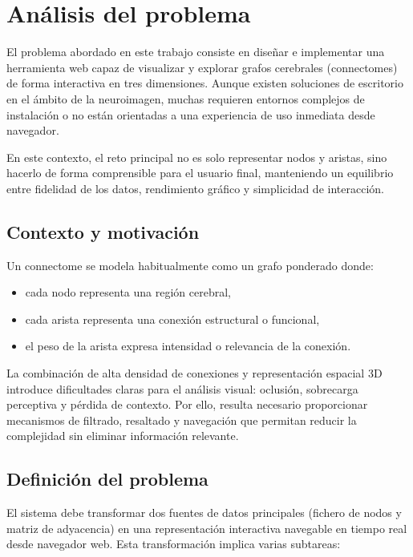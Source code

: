 \chapter{Análisis del problema}
 
El problema abordado en este trabajo consiste en diseñar e implementar una herramienta web capaz de visualizar y explorar grafos cerebrales (connectomes) de forma interactiva en tres dimensiones. Aunque existen soluciones de escritorio en el ámbito de la neuroimagen, muchas requieren entornos complejos de instalación o no están orientadas a una experiencia de uso inmediata desde navegador.

En este contexto, el reto principal no es solo representar nodos y aristas, sino hacerlo de forma comprensible para el usuario final, manteniendo un equilibrio entre fidelidad de los datos, rendimiento gráfico y simplicidad de interacción.

\section{Contexto y motivación}

Un connectome se modela habitualmente como un grafo ponderado donde:

\begin{itemize}
	\item cada nodo representa una región cerebral,
	\item cada arista representa una conexión estructural o funcional,
	\item el peso de la arista expresa intensidad o relevancia de la conexión.
\end{itemize}

La combinación de alta densidad de conexiones y representación espacial 3D introduce dificultades claras para el análisis visual: oclusión, sobrecarga perceptiva y pérdida de contexto. Por ello, resulta necesario proporcionar mecanismos de filtrado, resaltado y navegación que permitan reducir la complejidad sin eliminar información relevante.

\section{Definición del problema}

El sistema debe transformar dos fuentes de datos principales (fichero de nodos y matriz de adyacencia) en una representación interactiva navegable en tiempo real desde navegador web. Esta transformación implica varias subtareas:

